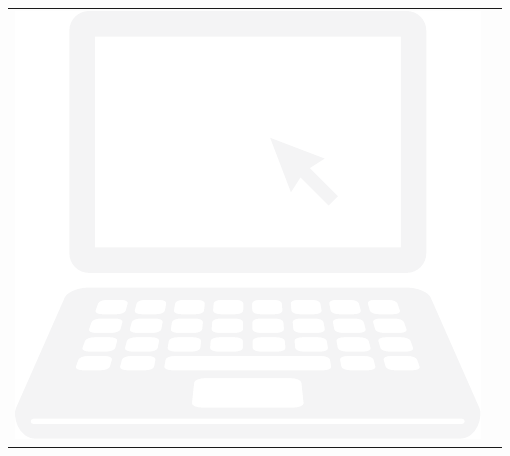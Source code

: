 {{\begin{multicols}{2}
\columnbreak

\begin{center}
\begin{lscshdrbox}
\begin{tabu}{X[1,c,m] X[2,l,m]}
\vspace{0pt}
\includegraphics[scale=0.15]{figures/component-assess.pdf}
&
\vspace{0pt}
\textcolor{white}{\textbf{\selectfont {ONLINE ASSESSMENT}}}
\end{tabu}
\end{lscshdrbox}
\end{center}
\end{multicols}
}


}
